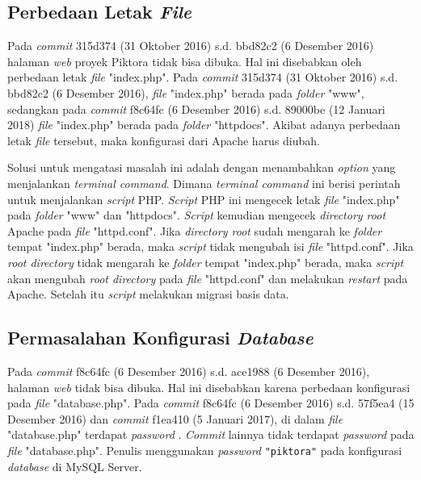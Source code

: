 \subsection{Perbedaan Letak \textit{File}}
\label{subsec:perbedaan_letak_file}
Pada \textit{commit} 315d374 (31 Oktober 2016) s.d. bbd82c2 (6 Desember 2016) halaman \textit{web} proyek Piktora tidak bisa dibuka. Hal ini disebabkan oleh perbedaan letak \textit{file} "index.php". Pada \textit{commit} 315d374 (31 Oktober 2016) s.d. bbd82c2 (6 Desember 2016), \textit{file} "index.php" berada pada \textit{folder} "www", sedangkan pada \textit{commit} f8c64fc (6 Desember 2016) s.d. 89000be (12 Januari 2018) \textit{file} "index.php" berada pada \textit{folder} "httpdocs". Akibat adanya perbedaan letak \textit{file} tersebut, maka konfigurasi dari Apache harus diubah.


Solusi untuk mengatasi masalah ini adalah dengan menambahkan \textit{option} yang menjalankan \textit{terminal command}. Dimana \textit{terminal command} ini berisi perintah untuk menjalankan \textit{script} PHP. \textit{Script} PHP ini mengecek letak \textit{file} "index.php" pada \textit{folder} "www" dan "httpdocs". \textit{Script} kemudian mengecek \textit{directory root} Apache pada \textit{file} "httpd.conf".  Jika \textit{directory root} sudah mengarah ke \textit{folder} tempat "index.php" berada, maka \textit{script} tidak mengubah isi \textit{file} "httpd.conf". Jika \textit{root directory} tidak mengarah ke \textit{folder} tempat "index.php" berada, maka \textit{script} akan mengubah \textit{root directory} pada \textit{file} "httpd.conf" dan melakukan \textit{restart} pada Apache. Setelah itu \textit{script} melakukan migrasi basis data.   


\subsection{Permasalahan Konfigurasi \textit{Database}}
\label{subsec:konfigurasi_database}
Pada \textit{commit} f8c64fc (6 Desember 2016) s.d. ace1988 (6 Desember 2016), halaman \textit{web} tidak bisa dibuka. Hal ini disebabkan karena perbedaan konfigurasi pada \textit{file} "database.php". Pada \textit{commit} f8c64fc (6 Desember 2016) s.d. 57f5ea4 (15 Desember 2016) dan \textit{commit} f1ea410 (5 Januari 2017), di dalam \textit{file} "database.php" terdapat \textit{password} . \textit{Commit} lainnya tidak terdapat \textit{password} pada \textit{file} "database.php". Penulis menggunakan \textit{password} \texttt{"piktora"} pada konfigurasi \textit{database} di MySQL Server.

